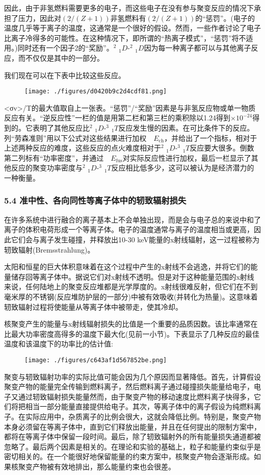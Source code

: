 因此，由于非氢燃料需要更多的电子，而这些电子在没有参与聚变反应的情况下承担了压力，因此对$(2/(Z+1))$非氢燃料有$(2/(Z+1))$的“惩罚”。(电子的温度几乎等于离子的温度，这通常是一个很好的假设。然而，一些作者讨论了电子比离子冷得多的可能性。在这种情况下，即所谓的“热离子模式”，“惩罚”将不适用。)同时还有一个因子2的“奖励”。$^{2}$ $_{1}D$-$^{2}$ $_{1}D$因为每一种离子都可以与其他离子反应，而不仅仅是其中的一部分。

我们现在可以在下表中比较这些反应。
\begin{figure}[ht]
\centering
\texttt{[image: ./figures/d0420b9c2d4cdf81.png]}
\caption \label{fig_HJB_10}
\end{figure}
<σv>/T的最大值取自上一张表。“惩罚”/“奖励”因素是与非氢反应物或单一物质反应有关。“逆反应性”一栏的值是用第二栏和第三栏的乘积除以1.24得到$\times10^{-24}$得到的。它表明了其他反应比$^{2}$ $_{1}D$-$^{3}$ $_{1}T$反应发生慢的因素。在可比条件下的反应。列“劳森准则”用以下公式对这些结果进行加权$\quad E_{\text{ch}}$，并给出了一个指标，相对于上述两种反应的难度，这些反应的点火难度相对于$^{2}$ $_{1}D$-$^{3}$ $_{1}T$反应要大很多。倒数第二列标有“功率密度”，并通过$\quad E_{\text{fus}}$对实际反应性进行加权，最后一栏显示了其他反应的聚变功率密度与$^{2}$ $_{1}D$-$^{3}$ $_{1}T$反应相比低多少，这可以被认为是经济潜力的一种衡量。
\subsubsection{5.4 准中性、各向同性等离子体中的轫致辐射损失}
在许多系统中进行融合的离子基本上不会单独出现，而是会与电子总的来说中和了离子的体积电荷形成一个等离子体。电子的温度通常与离子的温度相当或更高，因此它们会与离子发生碰撞，并释放出10-30 keV能量的x射线辐射，这一过程被称为轫致辐射(Bremsstrahlung)。

太阳和恒星的巨大体积意味着在这个过程中产生的x射线不会逃逸，并将它们的能量储存回等离子体中。据说它们对x射线不透明。但是对于这种能量范围的x射线来说，任何陆地上的聚变反应堆都是光学厚度的。x射线很难反射，但它们在不到毫米厚的不锈钢(反应堆防护层的一部分)中被有效吸收(并转化为热量)。这意味着轫致辐射过程将使能量从等离子体中被带走，使其冷却。

核聚变产生的能量与x射线辐射损失的比值是一个重要的品质因数。该比率通常在比最大功率密度高得多的温度下最大化(见前一小节)。下表显示了几种反应的最佳温度和该温度下的功率比的估计值:
\begin{figure}[ht]
\centering
\texttt{[image: ./figures/c643af1d567852be.png]}
\caption\label{fig_HJB_11}
\end{figure}
聚变与轫致辐射功率的实际比值可能会因为几个原因而显著降低。首先，计算假设聚变产物的能量完全传输到燃料离子，然后燃料离子通过碰撞损失能量给电子，电子又通过轫致辐射损失能量然而，由于聚变产物的移动速度比燃料离子快得多，它们将把相当一部分能量直接提供给电子。其次，等离子体中的离子假设为纯燃料离子。在实际应用中，杂质离子的比例会很大，这就会降低比例。特别是，聚变产物本身必须留在等离子体中，直到它们释放出能量，并且在任何提出的限制方案中，都将在等离子体中保留一段时间。最后，除了轫致辐射外的所有能量损失通道都被忽略了。最后两个因素是相关的。在理论和实验的基础上，粒子和能量约束似乎是密切相关的。在一个能很好地保留能量的约束方案中，核聚变产物会逐渐形成。如果核聚变产物被有效地排出，那么能量约束也会很差。

